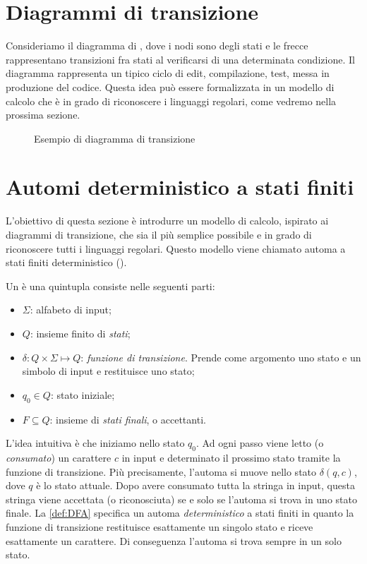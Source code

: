 \section{Diagrammi di transizione}\label{sec:diagrammi-di-transizione}

Consideriamo il diagramma di , dove i nodi sono degli stati e le frecce rappresentano
transizioni fra stati al verificarsi di una determinata condizione.
Il diagramma rappresenta un tipico ciclo di edit, compilazione, test, messa in produzione del codice.
Questa idea può essere formalizzata in un modello di calcolo che è in grado di riconoscere i linguaggi regolari, come
vedremo nella prossima sezione.


\begin{figure}[ht!]

\caption{Esempio di diagramma di transizione}
\label{fig:diagramma-transizione}\end{figure}


\section{Automi deterministico a stati finiti}\label{sec:DFA}

L'obiettivo di questa sezione è introdurre un modello di calcolo, ispirato ai diagrammi di transizione, che sia il più
semplice possibile e in grado di riconoscere tutti i linguaggi regolari.
Questo modello viene chiamato automa a stati finiti deterministico ().

\begin{definition}\label{def:DFA}
Un  è una quintupla \dfa consiste nelle seguenti parti:
\begin{itemize}
	\item $\Sigma$: alfabeto di input;
	\item $Q$: insieme finito di \emph{stati};
	\item $\delta: Q\times \Sigma \mapsto Q$: \emph{funzione di transizione}.
Prende come argomento uno stato e un simbolo di input e restituisce uno stato;
	\item $q_{0}\in Q$: stato iniziale;
	\item $F\subseteq Q$: insieme di \emph{stati finali}, o accettanti.
\end{itemize}
\end{definition}

L'idea intuitiva è che iniziamo nello stato $q_{0}$.
Ad ogni passo viene letto (o \emph{consumato}) un carattere $c$ in input e determinato il prossimo stato tramite la
funzione di transizione.
Più precisamente, l'automa si muove nello stato $\delta(q,c)$, dove $q$ è lo stato attuale.
Dopo avere consumato tutta la stringa in input, questa stringa viene accettata (o riconosciuta) se e solo se l'automa si
trova in uno stato finale.
La \ref{def:DFA} specifica un automa \emph{deterministico} a stati finiti in quanto la funzione di transizione
restituisce esattamente un singolo stato e riceve esattamente un carattere.
Di conseguenza l'automa si trova sempre in un solo stato.

